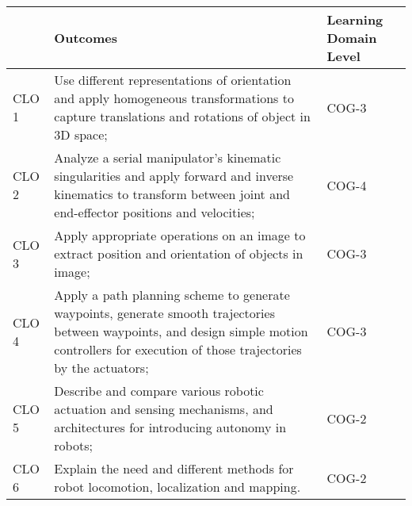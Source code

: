 \documentclass[a4paper]{article}
\begin{document}
\renewcommand{\arraystretch}{2}
\begin{tabular}[]{|m{}|m{}|m{}|}
\hline
& \textbf{Outcomes} & \textbf{Learning Domain Level} \\
\hline\hline
CLO 1 & Use different representations of orientation and apply homogeneous transformations to capture translations and rotations of object in 3D space; 
 & COG-3 \\\hline
CLO 2 & Analyze a serial manipulator's kinematic singularities and apply forward and inverse kinematics to transform between joint and end-effector positions and velocities; %
& COG-4\\\hline
CLO 3 & Apply appropriate operations on an image to extract position and orientation of objects in image; & COG-3\\\hline
CLO 4 & Apply a path planning scheme to generate waypoints, generate smooth trajectories between waypoints, and design simple motion controllers for execution of those trajectories by the actuators; & COG-3 \\\hline
CLO 5 & Describe and compare various robotic actuation and sensing mechanisms, and architectures for introducing autonomy in robots; & COG-2\\\hline
CLO 6 & Explain the need and different methods for robot locomotion, localization and mapping. & COG-2\\\hline


\end{tabular}
	
    
\end{document}
